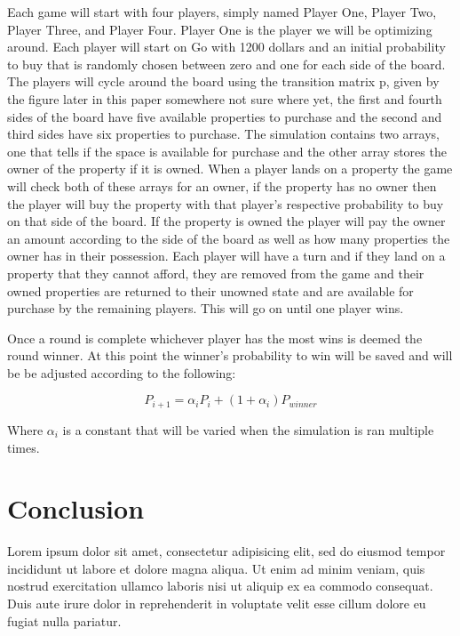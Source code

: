 \documentclass{article}
\begin{document}
	Each game will start with four players, simply named Player One, Player Two, Player Three, and Player Four.  Player One is the player we will be optimizing around.  Each player will start on Go with 1200 dollars and an initial probability to buy that is randomly chosen between zero and one for each side of the board.  The players will cycle around the board using the transition matrix p, given by the figure later in this paper somewhere not sure where yet, the first and fourth sides of the board have five available properties to purchase and the second and third sides have six properties to purchase.  The simulation contains two arrays, one that tells if the space is available for purchase and the other array stores the owner of the property if it is owned.  When a player lands on a property the game will check both of these arrays for an owner, if the property has no owner then the player will buy the property with that player’s respective probability to buy on that side of the board.  If the property is owned the player will pay the owner an amount according to the side of the board as well as how many properties the owner has in their possession.  Each player will have a turn and if they land on a property that they cannot afford, they are removed from the game and their owned properties are returned to their unowned state and are available for purchase by the remaining players.  This will go on until one player wins.  

	Once a round is complete whichever player has the most wins is deemed the round winner.  At this point the winner’s probability to win will be saved and will be be adjusted according to the following:

\begin{equation}
    \label{probability_adjustment}
    P_{i+1} = \alpha_i P_i + (1+\alpha_i)P_{winner}
\end{equation}

Where $\alpha_i$ is a constant that will be varied when the simulation is ran multiple times.

\section{Conclusion}

Lorem ipsum dolor sit amet, consectetur adipisicing elit, sed do eiusmod tempor
incididunt ut labore et dolore magna aliqua. Ut enim ad minim veniam, quis
nostrud exercitation ullamco laboris nisi ut aliquip ex ea commodo consequat.
Duis aute irure dolor in reprehenderit in voluptate velit esse cillum dolore eu
fugiat nulla pariatur.
\end{document}

